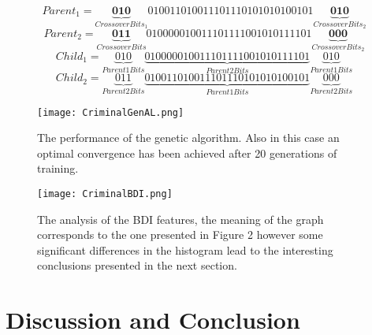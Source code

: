 \documentclass[a4paper]{article}
\begin{document}
\begin{equation}
	Parent_1 = \underbrace{\textbf{010}}_{Crossover Bits_1}{010011010011101110101010100101} \underbrace{\textbf{010}}_{Crossover Bits_2}
\end{equation}
\begin{equation}
	Parent_2 = \underbrace{\textbf{011}}_{Crossover Bits}{010000010011101111001010111101}
	\underbrace{\textbf{000}}_{Crossover Bits_2}
\end{equation}
\begin{equation}
	Child_1 = \underbrace{010}_{Parent 1 Bits} \underbrace{010000010011101111001010111101}_{Parent 2 Bits} \underbrace{010}_{Parent 1 Bits}
\end{equation}
\begin{equation}
	Child_2 = \underbrace{011}_{Parent 2 Bits}\underbrace{010011010011101110101010100101}_{Parent 1 Bits}
	\underbrace{000}_{Parent 2 Bits}
\end{equation}

\begin{figure}[ht!]
   \texttt{[image: CriminalGenAL.png]}
  \caption{The performance of the genetic algorithm. Also in this case an optimal convergence has been achieved after 20 generations of training.}\label{fig:awesome_image1}
\endminipage\hfill
{}
  \texttt{[image: CriminalBDI.png]}
  \caption{The analysis of the BDI features, the meaning of the graph corresponds to the one presented in Figure 2 however some significant differences in the histogram lead to the interesting conclusions presented in the next section.}\label{fig:awesome_image2}
\endminipage\hfill
\end{figure}


\section{Discussion and Conclusion}
\end{document}
